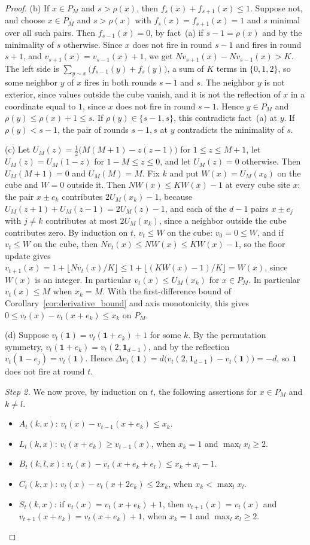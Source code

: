 \documentclass[12pt]{amsart}
\begin{document}
\begin{proof}
(b) If $x\in P_M$ and $s>\rho(x)$, then $f_s(x)+f_{s+1}(x)\leq1$. Suppose not, and choose $x\in P_M$ and $s>\rho(x)$ with $f_s(x)=f_{s+1}(x)=1$ and $s$ minimal over all such pairs. Then $f_{s-1}(x)=0$, by fact~(a) if $s-1=\rho(x)$ and by the minimality of $s$ otherwise. Since $x$ does not fire in round $s-1$ and fires in round $s+1$, and $v_{s+1}(x)=v_{s-1}(x)+1$, we get $Nv_{s+1}(x)-Nv_{s-1}(x)>K$. The left side is $\sum_{y\sim x}\big(f_{s-1}(y)+f_s(y)\big)$, a sum of $K$ terms in $\{0,1,2\}$, so some neighbor $y$ of $x$ fires in both rounds $s-1$ and $s$. The neighbor $y$ is not exterior, since values outside the cube vanish, and it is not the reflection of $x$ in a coordinate equal to $1$, since $x$ does not fire in round $s-1$. Hence $y\in P_M$ and $\rho(y)\leq\rho(x)+1\leq s$. If $\rho(y)\in\{s-1,s\}$, this contradicts fact~(a) at $y$. If $\rho(y)<s-1$, the pair of rounds $s-1,s$ at $y$ contradicts the minimality of $s$.

(c) Let $U_M(z)=\tfrac12\big(M(M+1)-z(z-1)\big)$ for $1\leq z\leq M+1$, let $U_M(z)=U_M(1-z)$ for $1-M\leq z\leq0$, and let $U_M(z)=0$ otherwise. Then $U_M(M+1)=0$ and $U_M(M)=M$. Fix $k$ and put $W(x)=U_M(x_k)$ on the cube and $W=0$ outside it. Then $NW(x)\leq KW(x)-1$ at every cube site $x$: the pair $x\pm e_k$ contributes $2U_M(x_k)-1$, because $U_M(z+1)+U_M(z-1)=2U_M(z)-1$, and each of the $d-1$ pairs $x\pm e_j$ with $j\neq k$ contributes at most $2U_M(x_k)$, since a neighbor outside the cube contributes zero. By induction on $t$, $v_t\leq W$ on the cube: $v_0=0\leq W$, and if $v_t\leq W$ on the cube, then $Nv_t(x)\leq NW(x)\leq KW(x)-1$, so the floor update gives $v_{t+1}(x)=1+\lfloor Nv_t(x)/K\rfloor\leq1+\lfloor(KW(x)-1)/K\rfloor=W(x)$, since $W(x)$ is an integer. In particular $v_t(x)\leq U_M(x_k)$ for $x\in P_M$. In particular $v_t(x)\leq M$ when $x_k=M$. With the first-difference bound of Corollary~\ref{cor:derivative_bound} and axis monotonicity, this gives $0\leq v_t(x)-v_t(x+e_k)\leq x_k$ on $P_M$.

(d) Suppose $v_t(\mathbf{1})=v_t(\mathbf{1}+e_k)+1$ for some $k$. By the permutation symmetry, $v_t(\mathbf{1}+e_k)=v_t(2,\mathbf{1}_{d-1})$, and by the reflection $v_t(\mathbf{1}-e_j)=v_t(\mathbf{1})$. Hence $\Delta v_t(\mathbf{1})=d\big(v_t(2,\mathbf{1}_{d-1})-v_t(\mathbf{1})\big)=-d$, so $\mathbf{1}$ does not fire at round $t$.

\emph{Step 2.} We now prove, by induction on $t$, the following assertions for $x\in P_M$ and $k\neq l$.

\begin{itemize}
\item $A_t(k,x)$: $v_t(x)-v_{t-1}(x+e_k)\leq x_k$.
\item $L_t(k,x)$: $v_t(x+e_k)\geq v_{t-1}(x)$, when $x_k=1$ and $\max_l x_l\geq2$.
\item $B_t(k,l,x)$: $v_t(x)-v_t(x+e_k+e_l)\leq x_k+x_l-1$.
\item $C_t(k,x)$: $v_t(x)-v_t(x+2e_k)\leq 2x_k$, when $x_k<\max_l x_l$.
\item $S_t(k,x)$: if $v_t(x)=v_t(x+e_k)+1$, then $v_{t+1}(x)=v_t(x)$ and $v_{t+1}(x+e_k)=v_t(x+e_k)+1$, when $x_k=1$ and $\max_l x_l\geq2$.
\end{itemize}


\end{proof}
\end{document}
